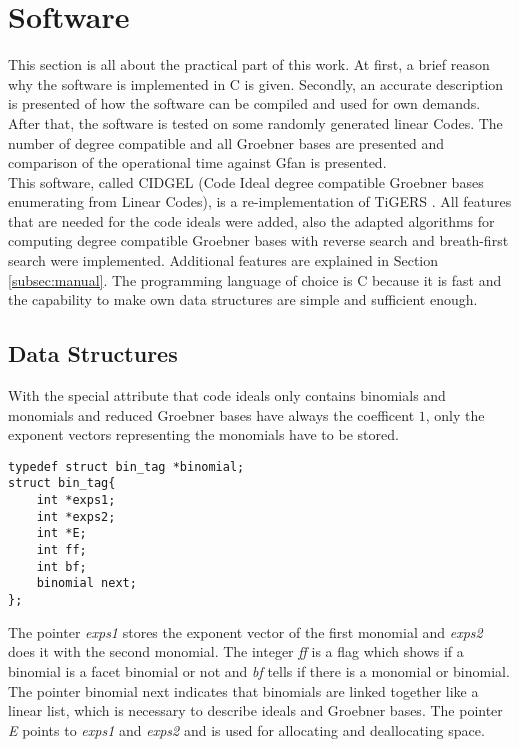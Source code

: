 \section{Software}
\label{sec:software}
This section is all about the practical part of this work. At first, a brief reason why the software is implemented in C is given. Secondly, an accurate description is presented of how the software can be compiled and used for own demands.
After that, the software is tested on some randomly generated linear Codes. The number of degree compatible and all Groebner bases are presented and comparison of the operational time against Gfan \cite{gfan} is presented. \\
This software, called CIDGEL (Code Ideal degree compatible Groebner bases enumerating from Linear Codes), is a re-implementation of TiGERS \cite{tigers}. All features that are needed for the code ideals were added, also the adapted algorithms for computing degree compatible Groebner bases with reverse search and breath-first search were implemented.   
Additional features are explained in Section \ref{subsec:manual}.
The programming language of choice is C because it is fast and the capability to make own data structures are simple and sufficient enough.

\subsection{Data Structures}
\label{subsec:datastructure}
With the special attribute that code ideals only contains binomials and monomials and reduced Groebner bases have always the coefficent $1$, only the exponent vectors representing the monomials have to be stored.


\begin{lstlisting} 
typedef struct bin_tag *binomial;
struct bin_tag{
    int *exps1;
    int *exps2;
    int *E;
    int ff;
    int bf;
    binomial next;
};

\end{lstlisting}

The pointer \emph{exps1} stores the exponent vector of the first monomial and \emph{exps2} does it with the second monomial.
The integer \emph{ff} is a flag which shows if a binomial is a facet binomial or not and \emph{bf} tells if there is a monomial or binomial.
The pointer binomial next indicates that binomials are linked together like a linear list, which is necessary to describe ideals and Groebner bases. The pointer \emph{E} points to \emph{exps1} and \emph{exps2} and is used for allocating and deallocating space. \\

